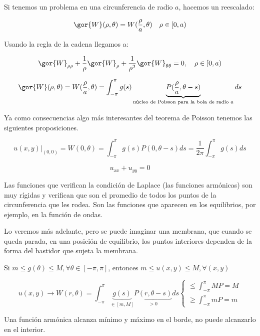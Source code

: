 
		Si tenemos un problema en una circunferencia de radio $a$, hacemos un reescalado:

		\[ \gor{W}(\rho, \theta) = W(\frac{\rho}{a},\theta) \quad \rho \in [0,a) \]

		Usando la regla de la cadena llegamos a:

		\[\gor{W}_{\rho \rho} + \frac{1}{\rho} \gor{W}_\rho + \frac{1}{\rho^2} \gor{W}_{\theta \theta} = 0, \quad \rho \in [0,a)  \]

		\[\gor{W}(\rho, \theta) = W(\frac{\rho}{a},\theta) = \int^{\pi}_{-\pi} g(s)\underbrace{P(\frac{\rho}{a},\theta-s)}_{\text{núcleo de Poisson para la bola de radio }a} ds \]

		Ya como consecuencias algo más interesantes del teorema de Poisson tenemos las siguientes proposiciones.

		\begin{prop}

		 \[u(x,y)|_{(0,0)}  = W(0,\theta) = \int_{-\pi}^\pi g(s) P(0, \theta - s) ds = \frac{1}{2\pi} \int_{-\pi}^\pi g(s) ds \]

		 \[ u_{xx} + u_{yy} = 0\]
		\end{prop}

		 Las funciones que verifican la condición de Laplace (las funciones armónicas) son muy rígidas y verifican que son el promedio de todos los puntos de la circunferencia que les rodea. Son las funciones que aparecen en los equilibrios, por ejemplo, en la función de ondas.

		Lo veremos más adelante, pero se puede imaginar una membrana, que cuando se queda parada, en una posición de equilibrio, los puntos interiores dependen de la forma del bastidor que sujeta la membrana.

		\begin{prop}
		Si $m \leq g(\theta) \leq M, \forall \theta \in [-\pi,\pi]$, entonces $m \leq u(x,y) \leq M, \forall (x,y)$

		\[u(x,y) \rightarrow W(r,\theta) = \int_{-\pi}^{\pi} \underbrace{g(s)}_{\in [m,M]} \underbrace{P(r,\theta-s)}_{> 0} ds \begin{cases}
			\leq \int_{-\pi}^{\pi} MP = M \\
			\geq \int_{-\pi}^{\pi} mP = m

		\end{cases} \]

		Una función armónica alcanza mínimo y máximo en el borde, no puede alcanzarlo en el interior.
		\end{prop}

